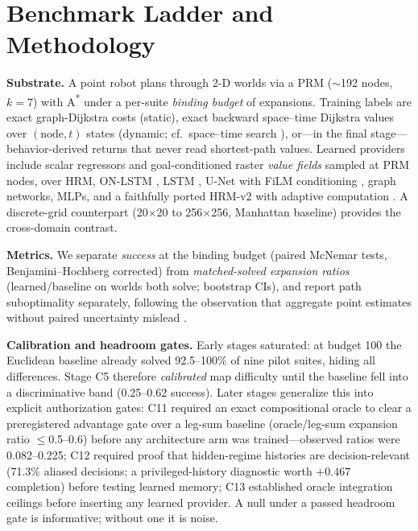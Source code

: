\documentclass[letterpaper]{article} %
\newcommand{\stage}[1]{\textsc{#1}}
\begin{document}
\section{Benchmark Ladder and Methodology}

\textbf{Substrate.} A point robot plans through 2-D worlds via a PRM ($\sim$192 nodes, $k{=}7$) with A\textsuperscript{*} \citep{hart1968astar} under a per-suite \emph{binding budget} of expansions. Training labels are exact graph-Dijkstra costs (static), exact backward space--time Dijkstra values over $(\text{node},t)$ states (dynamic; cf.\ space--time search \citealp{silver2005cooperative,phillips2011sipp}), or---in the final stage---behavior-derived returns that never read shortest-path values. Learned providers include scalar regressors and goal-conditioned raster \emph{value fields} sampled at PRM nodes, over HRM, ON-LSTM \citep{shen2019onlstm}, LSTM \citep{hochreiter1997lstm}, U-Net \citep{ronneberger2015unet} with FiLM conditioning \citep{perez2018film}, graph networks, MLPs, and a faithfully ported HRM-v2 with adaptive computation \citep{graves2016act,banino2021pondernet}. A discrete-grid counterpart (20$\times$20 to 256$\times$256, Manhattan baseline) provides the cross-domain contrast.

\textbf{Metrics.} We separate \emph{success} at the binding budget (paired McNemar tests, Benjamini--Hochberg corrected) from \emph{matched-solved expansion ratios} (learned/baseline on worlds both solve; bootstrap CIs), and report path suboptimality separately, following the observation that aggregate point estimates without paired uncertainty mislead \citep{henderson2018matters,agarwal2021precipice}.

\textbf{Calibration and headroom gates.} Early stages saturated: at budget 100 the Euclidean baseline already solved 92.5--100\% of nine pilot suites, hiding all differences. Stage \stage{C5} therefore \emph{calibrated} map difficulty until the baseline fell into a discriminative band (0.25--0.62 success). Later stages generalize this into explicit authorization gates: \stage{C11} required an exact compositional oracle to clear a preregistered advantage gate over a leg-sum baseline (oracle/leg-sum expansion ratio $\leq$0.5--0.6) before any architecture arm was trained---observed ratios were 0.082--0.225; \stage{C12} required proof that hidden-regime histories are decision-relevant (71.3\% aliased decisions; a privileged-history diagnostic worth $+0.467$ completion) before testing learned memory; \stage{C13} established oracle integration ceilings before inserting any learned provider. A null under a passed headroom gate is informative; without one it is noise.
\end{document}
